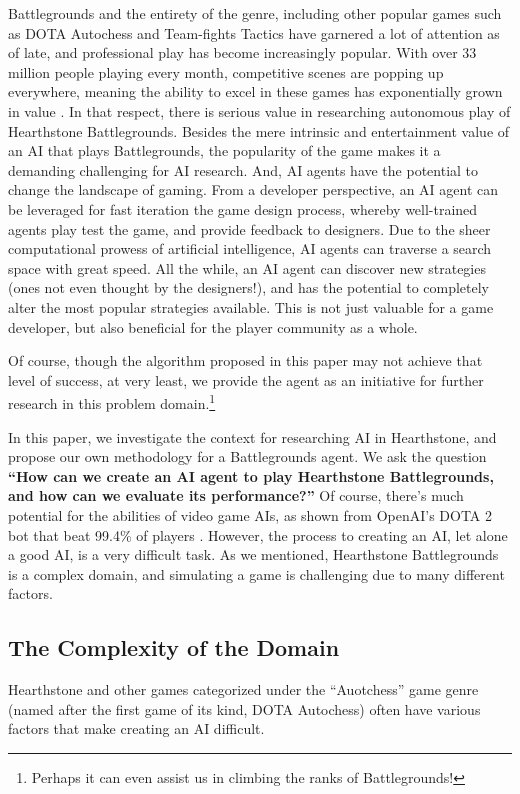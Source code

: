\documentclass{paper}
\begin{document}
Battlegrounds and the entirety of the genre, including other popular games such as DOTA Autochess and Team-fights Tactics have garnered a lot of attention as of late, and professional play has become increasingly popular. With over 33 million people playing  every month, competitive scenes are popping up everywhere, meaning the ability to excel in these games has exponentially grown in value \cite{stavropoulos_2019}. In that respect, there is serious value in researching autonomous play of Hearthstone Battlegrounds. Besides the mere intrinsic and entertainment value of an AI that plays Battlegrounds, the popularity of the game makes it a demanding challenging for AI research. And, AI agents have the potential to change the landscape of gaming. From a developer perspective, an AI agent can be leveraged for fast iteration the game design process, whereby well-trained agents play test the game, and provide feedback to designers. Due to the sheer computational prowess of artificial intelligence, AI agents can traverse a search space with great speed. All the while, an AI agent can discover new strategies (ones not even thought by the designers!), and has the potential to completely alter the most popular strategies available. This is not just valuable for a game developer, but also beneficial for the player community as a whole. 

Of course, though the algorithm proposed in this paper may not achieve that level of success, at very least, we provide the agent as an initiative for further research in this problem domain.\footnote{Perhaps it can even assist us in climbing the ranks of Battlegrounds!}

In this paper, we investigate the context for researching AI in Hearthstone, and propose our own methodology for a Battlegrounds agent. We ask the question \textbf{``How can we create an AI agent to play Hearthstone Battlegrounds, and how can we evaluate its performance?''} Of course, there's much potential for the abilities of video game AIs, as shown from OpenAI's DOTA 2 bot that beat 99.4\% of players \cite{wiggers_2019}. However, the process to creating an AI, let alone a good AI, is a very difficult task. As we mentioned, Hearthstone Battlegrounds is a complex domain, and simulating a game is challenging due to many different factors. 


\subsection{The Complexity of the Domain}
Hearthstone and other games categorized under the ``Auotchess'' game genre (named after the first game of its kind, DOTA Autochess) %
often have various factors that make creating an AI difficult.
\end{document}
